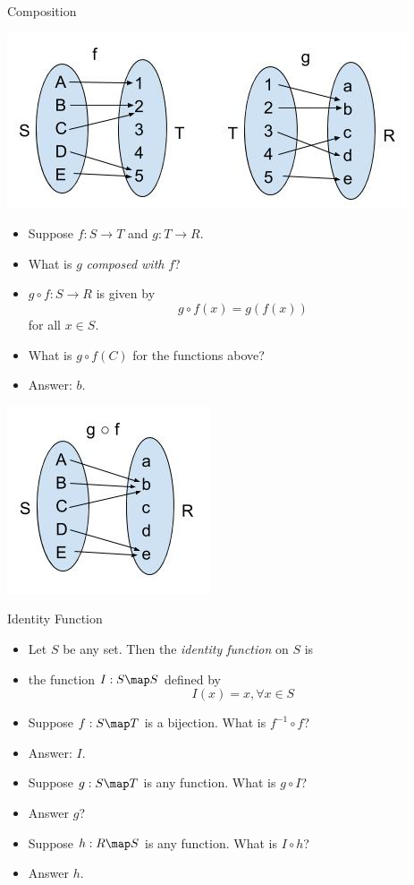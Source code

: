 \documentclass{beamer}
\begin{document}
\begin{frame}{Composition}

\begin{center}
\includegraphics[scale=0.25]{function_composition}
\end{center}

\begin{itemize}
\item Suppose $f:S\to T$ and $g:T \to R$.
\item What is $g$ \emph{composed with} $f$?
\item $g \circ f: S \to R$ is given by
$$g \circ f (x) = g(f(x))$$ for all $x\in S$.
\item What is $g \circ f (C)$ for the functions above?
\item Answer: $b$.
\end{itemize}

\pause

\begin{center}
\includegraphics[scale=0.25]{functions_composed}
\end{center}

\end{frame}


\begin{frame}{Identity Function}


\begin{itemize}
\item Let $S$ be any set. Then the \emph{identity function} on $S$ is
\item the function $I:S\map S$ defined by
$$I(x) = x ,\forall x \in S$$
\item Suppose $f:S\map T$ is a bijection. What is $f^{-1} \circ f$?
\item Answer: $I$.
\item Suppose $g:S\map T$ is any function. What is $g\circ I$?
\item Answer $g$?
\item Suppose $h:R\map S$ is any function. What is $I \circ h$?
\item Answer $h$.
\end{itemize}


\end{frame}
\end{document}
